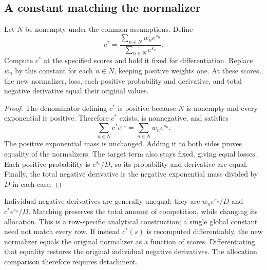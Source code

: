 \subsection{A constant matching the normalizer}
\begin{proposition}
Let $N$ be nonempty under the common assumptions. Define
\begin{equation}
c^*=\frac{\sum_{n\in N}w_ne^{s_n}}{\sum_{n\in N}e^{s_n}}.
\end{equation}
Compute $c^*$ at the specified scores and hold it fixed for differentiation. Replace $w_n$ by this constant for each $n\in N$, keeping positive weights one. At these scores, the new normalizer, loss, each positive probability and derivative, and total negative derivative equal their original values.
\end{proposition}
\begin{proof}
The denominator defining $c^*$ is positive because $N$ is nonempty and every exponential is positive. Therefore $c^*$ exists, is nonnegative, and satisfies
\begin{equation}
\sum_{n\in N}c^*e^{s_n}=\sum_{n\in N}w_ne^{s_n}.
\end{equation}
The positive exponential mass is unchanged. Adding it to both sides proves equality of the normalizers. The target term also stays fixed, giving equal losses. Each positive probability is $e^{s_p}/D$, so its probability and derivative are equal. Finally, the total negative derivative is the negative exponential mass divided by $D$ in each case.
\end{proof}
Individual negative derivatives are generally unequal: they are $w_ne^{s_n}/D$ and $c^*e^{s_n}/D$. Matching preserves the total amount of competition, while changing its allocation. This is a row-specific analytical construction; a single global constant need not match every row. If instead $c^*(s)$ is recomputed differentiably, the new normalizer equals the original normalizer as a function of scores. Differentiating that equality restores the original individual negative derivatives. The allocation comparison therefore requires detachment.


